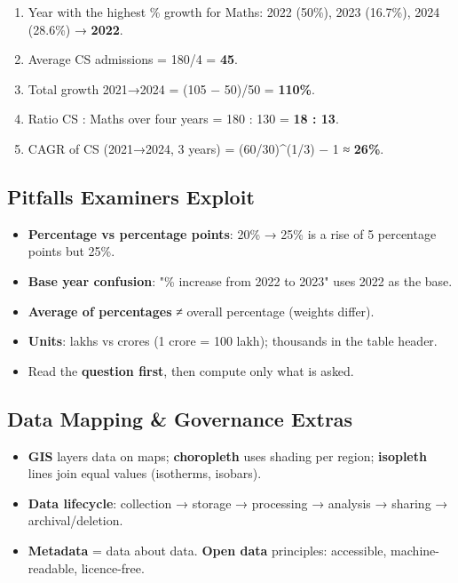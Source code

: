 \endgroup

\begin{enumerate}
\def\labelenumi{\arabic{enumi}.}
\tightlist
\item
  Year with the highest \% growth for Maths: 2022 (50\%), 2023 (16.7\%), 2024 (28.6\%) → \textbf{2022}.
\item
  Average CS admissions = 180/4 = \textbf{45}.
\item
  Total growth 2021→2024 = (105 − 50)/50 = \textbf{110\%}.
\item
  Ratio CS : Maths over four years = 180 : 130 = \textbf{18 : 13}.
\item
  CAGR of CS (2021→2024, 3 years) = (60/30)\^{}(1/3) − 1 ≈ \textbf{26\%}.
\end{enumerate}

\needspace{95pt}

\hypertarget{p1-07--73-pitfalls-examiners-exploit}{%
\subsection{Pitfalls Examiners Exploit}\label{p1-07--73-pitfalls-examiners-exploit}}

\begin{itemize}
\tightlist
\item
  \textbf{Percentage vs percentage points}: 20\% → 25\% is a rise of 5 percentage points but 25\%.
\item
  \textbf{Base year confusion}: "\% increase from 2022 to 2023" uses 2022 as the base.
\item
  \textbf{Average of percentages} ≠ overall percentage (weights differ).
\item
  \textbf{Units}: lakhs vs crores (1 crore = 100 lakh); thousands in the table header.
\item
  Read the \textbf{question first}, then compute only what is asked.
\end{itemize}

\needspace{95pt}

\hypertarget{p1-07--74-data-mapping--governance-extras}{%
\subsection{Data Mapping \& Governance Extras}\label{p1-07--74-data-mapping--governance-extras}}

\begin{itemize}
\tightlist
\item
  \textbf{GIS} layers data on maps; \textbf{choropleth} uses shading per region; \textbf{isopleth} lines join equal values (isotherms, isobars).
\item
  \textbf{Data lifecycle}: collection → storage → processing → analysis → sharing → archival/deletion.
\item
  \textbf{Metadata} = data about data. \textbf{Open data} principles: accessible, machine-readable, licence-free.
\end{itemize}

